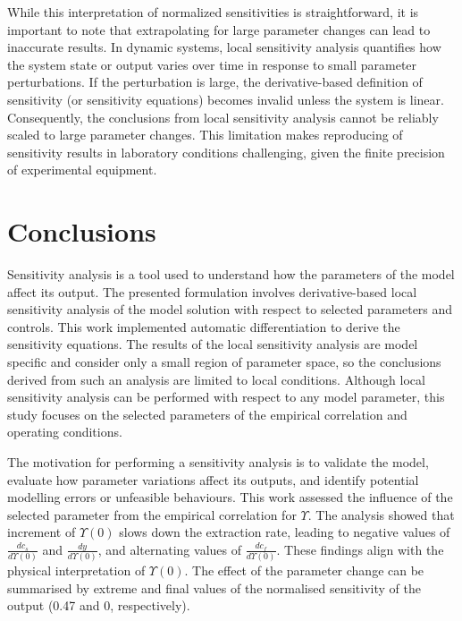 \documentclass[a4paper,fleqn]{cas-dc}
\begin{document}
	While this interpretation of normalized sensitivities is straightforward, it is important to note that extrapolating for large parameter changes can lead to inaccurate results. In dynamic systems, local sensitivity analysis quantifies how the system state or output varies over time in response to small parameter perturbations. If the perturbation is large, the derivative-based definition of sensitivity (or sensitivity equations) becomes invalid unless the system is linear. Consequently, the conclusions from local sensitivity analysis cannot be reliably scaled to large parameter changes. This limitation makes reproducing of sensitivity results in laboratory conditions challenging, given the finite precision of experimental equipment.
	
	\section{Conclusions} \label{CH: Conclusion}
	
	Sensitivity analysis is a tool used to understand how the parameters of the model affect its output. The presented formulation involves derivative-based local sensitivity analysis of the model solution with respect to selected parameters and controls. This work implemented automatic differentiation to derive the sensitivity equations. The results of the local sensitivity analysis are model specific and consider only a small region of parameter space, so the conclusions derived from such an analysis are limited to local conditions. Although local sensitivity analysis can be performed with respect to any model parameter, this study focuses on the selected parameters of the empirical correlation and operating conditions.
	
	The motivation for performing a sensitivity analysis is to validate the model, evaluate how parameter variations affect its outputs, and identify potential modelling errors or unfeasible behaviours. This work assessed the influence of the selected parameter from the empirical correlation for $\Upsilon$. The analysis showed that increment of $\Upsilon(0)$ slows down the extraction rate, leading to negative values of $\frac{dc_s}{d\Upsilon(0)}$ and $\frac{dy}{d\Upsilon(0)}$, and alternating values of $\frac{dc_f}{d\Upsilon(0)}$. These findings align with the physical interpretation of $\Upsilon(0)$. The effect of the parameter change can be summarised by extreme and final values of the normalised sensitivity of the output (0.47 and 0, respectively).
	
\end{document}
